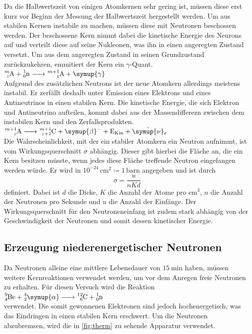 Da die Halbwertszeit von einigen Atomkernen sehr gering ist, müssen diese erst kurz vor Beginn der Messung der Halbwertszeit hergestellt werden. Um aus stabilen Kernen
instabile zu machen, müssen diese mit Neutronen beschossen werden. Der beschossene Kern nimmt dabei die kinetische Energie des Neurons auf und verteilt diese auf seine
Nukleonen, was ihn in einen angeregten Zustand versetzt. Um aus dem angeregten Zustand in seinen Grundzustand zurückzukehren, emmitiert der Kern ein $\gamma$-Quant. \\
\newline
$\ce{^{m}_zA + ^{1}_0n -> ^{m+1}_zA + \symup{\gamma}}$ \\
\newline
Aufgrund des zusätzlichen Neutrons ist der neue Atomkern allerdings meistens instabil. Er zerfällt deshalb unter Emission eines Elektrons und eines Antineutrinos in einen
stabilen Kern. Die kinetische Energie, die sich Elektron und Antineutrino aufteilen, kommt dabei aus der Massendifferezn zwischen dem instabilen Kern und den
Zerfallsprodukten. \\
\newline
$  \ce{  ^{m+1}_zA -> ^{m+1}_{z+1}C + \symup{\beta}- + E_{Kin} + \bar{\symup{\nu}}_e}   $ \\
\newline
Die Wahrscheinlichkeit, mit der ein stabiler Atomkern ein Neutron aufnimmt, ist vom Wirkungsquerschnitt $\sigma$ abhängig. Dieser gibt hierbei die Fläche an, die ein Kern
besitzen müsste, wenn jedes diese Fläche treffende Neutron eingefangen werden würde. Er wird in $10^{-24} \, \si{\centi\metre\squared} \coloneqq 1 \, \mathrm{barn}$
angegeben und ist durch
\begin{equation}
    \label{eqn:Sigma}
    \sigma = \frac{u}{nKd}
\end{equation}
definiert. Dabei ist $d$ die Dicke, $K$ die Anzahl der Atome pro $\unit{\centi\meter^3}$, $n$ die Anzahl der Neutronen pro Sekunde und $u$ die Anzahl der Einfänge.
Der Wirkungsquerschnitt für den Neutroneneinfang ist zudem stark abhängig von der Geschwindigkeit der Neutronen und
somit dessen kinetischer Energie.


\subsection{Erzeugung niederenergetischer Neutronen}

Da Neutronen alleine eine mittlere Lebensdauer von $\SI{15}{\minute}$ haben, müssen weitere Kernreaktionen verwendet werden, um vor dem Anregen freie Neutronen zu erhalten.
Für diesen Versuch wird die Reaktion \\
\newline
$\ce{^{9}_{4}Be + ^{4}_{2}\symup{\alpha} -> ^{12}_{6}C + ^{1}_0n}$ \\
\newline
verwendet. Die somit gewonnenen Elektronen sind jedoch hochenergetisch, was das Eindringen in einen stabilen Kern erschwert. Um die Neutronen abzubremsen, wird die in
\autoref{fig:therm} zu sehende Apparatur verwendet.

